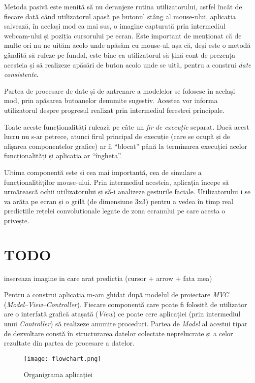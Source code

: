 Metoda pasivă este menită să nu deranjeze rutina utilizatorului, astfel încât de fiecare dată când utilizatorul apasă pe butonul stâng al mouse-ului, aplicația salvează, în același mod ca mai sus, o imagine capturată prin intermediul webcam-ului și poziția cursorului pe ecran.
Este important de menționat că de multe ori nu ne uităm acolo unde apăsăm cu mouse-ul, așa că, deși este o metodă gândită să ruleze pe fundal, este bine ca utilizatorul să țină cont de prezența acesteia și să realizeze apăsări de buton acolo unde se uită, pentru a construi \emph{date consistente}.

Partea de procesare de date și de antrenare a modelelor se folosesc în același mod, prin apăsarea butoanelor denumite sugestiv.
Acestea vor informa utilizatorul despre progresul realizat prin intermediul ferestrei principale.

Toate aceste funcționalități rulează pe câte un \emph{fir de execuție} separat.
Dacă acest lucru nu s-ar petrece, atunci firul principal de execuție (care se ocupă și de afișarea componentelor grafice) ar fi ``blocat'' până la terminarea execuției acelor funcționalități și aplicația ar ``îngheța''.

Ultima componentă este și cea mai importantă, cea de simulare a funcționalităților mouse-ului.
Prin intermediul acesteia, aplicația începe să urmărească ochii utilizatorului și să-i analizeze gesturile faciale.
Utilizatorului i se va arăta pe ecran și o grilă (de dimensiune 3x3) pentru a vedea în timp real predicțiile rețelei convoluționale legate de zona ecranului pe care acesta o privește.

\section{TODO}
insereaza imagine in care arat predictia (cursor + arrow + fata mea)

Pentru a construi aplicația m-am ghidat după modelul de proiectare \emph{MVC} (\emph{Model–View–Controller}).
Fiecare componentă care poate fi folosită de utilizator are o interfață grafică atașată (\emph{View}) ce poate cere aplicației (prin intermediul unui \emph{Controller}) să realizeze anumite proceduri.
Partea de \emph{Model} al acestui tipar de dezvoltare constă în structurarea datelor colectate neprelucrate și a celor rezultate din partea de procesare a datelor.

\begin{figure}[ht]
    \centering
    \texttt{[image: flowchart.png]}
    \caption{Organigrama aplicației}
\end{figure}
